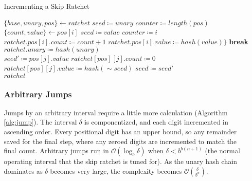 \documentclass{article}
\begin{document}
	\begin{algorithm}
		\caption{Incrementing a Skip Ratchet}
		\label{alg:inc}

		\begin{algorithmic}[1]
				\State $\{base, unary, pos\} \gets ratchet$
				\State $seed \coloneqq unary$
				\State $counter \coloneqq length(pos)$
				\\
					\State $\{count, value\} \gets pos[i]$
					 
						\State $seed \coloneqq value$
						\State $counter \coloneqq i$
						\State $ratchet.pos[i].count \coloneqq count + 1$ \State $ratchet.pos[i].value \coloneqq hash(value)\}$
						\State \textbf{break}
					\EndIf
				\EndFor
				\\
				 
					\State $ratchet.unary \coloneqq hash(unary)$
				\EndIf
				\\
					 
						\State $seed' \coloneqq pos[j].value$
						\State $ratchet[pos][j].count \coloneqq 0$
						\State $ratchet[pos][j].value \coloneqq hash(\sim{seed})$
						\State $seed \coloneqq seed'$
					\EndFor
				\EndIf
				\\
				\State $ratchet$
				\EndFunction
		\end{algorithmic}
	\end{algorithm}

	\subsubsection{Arbitrary Jumps}

	Jumps by an arbitrary interval require a little more calculation (Algorithm \ref{alg:jump}). The interval $\delta$ is componentized, and each digit incremented in ascending order. Every positional digit has an upper bound, so any remainder saved for the final step, where any zeroed digits are incremented to match the final count. Arbitrary jumps run in $\mathcal{O}(\log_{b} \delta)$ when $\delta < b^{b(n+1)}$ (the normal operating interval that the skip ratchet is tuned for). As the unary hash chain dominates as $\delta$ becomes very large, the complexity becomes $\mathcal{O}(\frac{\delta}{b^{n}})$.
\end{document}
